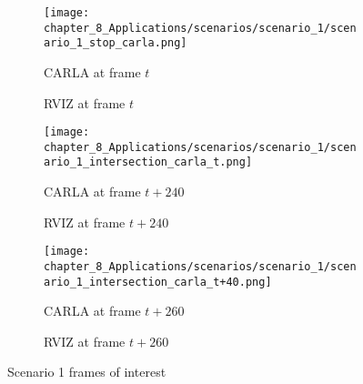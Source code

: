 \begin{figure}[]
	\begin{subfigure}[b]{0.48\textwidth}
		\centering
		\texttt{[image: chapter\_8\_Applications/scenarios/scenario\_1/scenario\_1\_stop\_carla.png]}
		\caption{\ac{CARLA} at frame $t$}
		\label{subfig:chapter_8_Applications/scenarios/scenario_1/scenario_1_stop_carla}
	\end{subfigure}
	\hfill
	\begin{subfigure}[b]{0.48\textwidth}
		\centering
		\caption{\ac{RVIZ} at frame $t$}
		\label{subfig:chapter_8_Applications/scenarios/scenario_1/scenario_1_stop_rviz}
	\end{subfigure}
	\tabularnewline
	\begin{subfigure}[b]{0.48\textwidth}
		\centering
		\texttt{[image: chapter\_8\_Applications/scenarios/scenario\_1/scenario\_1\_intersection\_carla\_t.png]}
		\caption{\ac{CARLA} at frame $t+240$}
		\label{subfig:chapter_8_Applications/scenarios/scenario_1/scenario_1_intersection_carla_t}
	\end{subfigure}
	\hfill
	\begin{subfigure}[b]{0.48\textwidth}
		\centering
		\caption{\ac{RVIZ} at frame $t+240$}
		\label{subfig:chapter_8_Applications/scenarios/scenario_1/scenario_1_intersection_rviz_t}
	\end{subfigure}
	\tabularnewline
	\begin{subfigure}[b]{0.48\textwidth}
		\centering
		\texttt{[image: chapter\_8\_Applications/scenarios/scenario\_1/scenario\_1\_intersection\_carla\_t+40.png]}
		\caption{\ac{CARLA} at frame $t+260$}
		\label{subfig:chapter_8_Applications/scenarios/scenario_1/scenario_1_intersection_carla_t+40}
	\end{subfigure}
	\hfill
	\begin{subfigure}[b]{0.48\textwidth}
		\centering
		\caption{\ac{RVIZ} at frame $t+260$}
		\label{subfig:chapter_8_Applications/scenarios/scenario_1/scenario_1_intersection_rviz_t+40}
	\end{subfigure}
	\tabularnewline
	\caption{Scenario 1 frames of interest}
	\label{fig:chapter_8_Applications/scenarios/scenario_1_frames_of_interest}
\end{figure}

